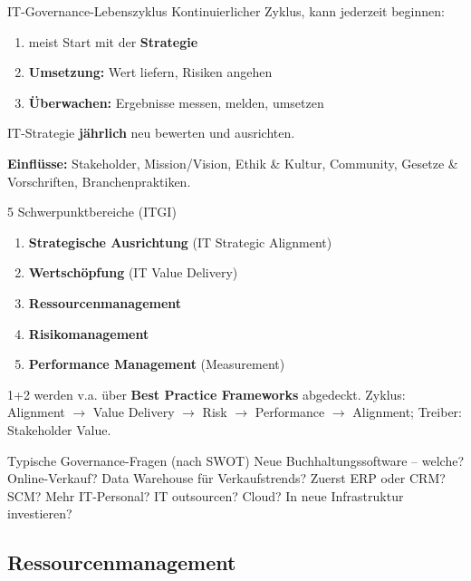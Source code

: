 \documentclass[a4paper, fontsize=7pt]{scrartcl}
\begin{document}
\begin{mainbox}{IT-Governance-Lebenszyklus}
Kontinuierlicher Zyklus, kann jederzeit beginnen:
\begin{enumerate}
    \item meist Start mit der \textbf{Strategie}
    \item \textbf{Umsetzung:} Wert liefern, Risiken angehen
    \item \textbf{Überwachen:} Ergebnisse messen, melden, umsetzen
\end{enumerate}
IT-Strategie \textbf{jährlich} neu bewerten und ausrichten.

\textbf{Einflüsse:} Stakeholder, Mission/Vision, Ethik \& Kultur, Community,
Gesetze \& Vorschriften, Branchenpraktiken.
\end{mainbox}

\begin{mainbox}{5 Schwerpunktbereiche (ITGI)}
\begin{enumerate}
    \item \textbf{Strategische Ausrichtung} (IT Strategic Alignment)
    \item \textbf{Wertschöpfung} (IT Value Delivery)
    \item \textbf{Ressourcenmanagement}
    \item \textbf{Risikomanagement}
    \item \textbf{Performance Management} (Measurement)
\end{enumerate}
1+2 werden v.a. über \textbf{Best Practice Frameworks} abgedeckt.
Zyklus: Alignment $\to$ Value Delivery $\to$ Risk $\to$ Performance
$\to$ Alignment; Treiber: Stakeholder Value.
\end{mainbox}

\begin{subbox}{Typische Governance-Fragen (nach SWOT)}
Neue Buchhaltungssoftware -- welche? Online-Verkauf? Data Warehouse für
Verkaufstrends? Zuerst ERP oder CRM? SCM? Mehr IT-Personal? IT outsourcen?
Cloud? In neue Infrastruktur investieren?
\end{subbox}

\subsection{Ressourcenmanagement}
\end{document}
